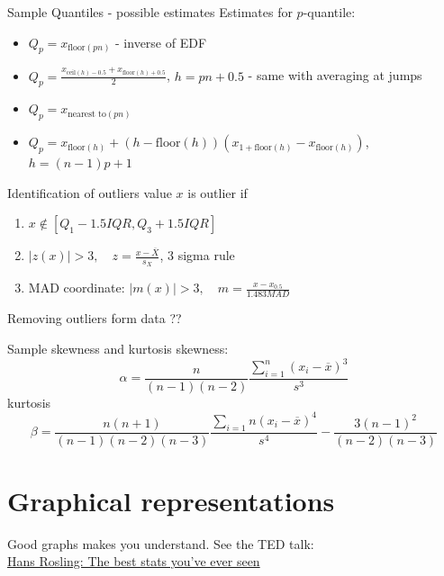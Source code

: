 \documentclass[smaller, hyperref={colorlinks=true}]{beamer}
\def\abs#1{\lvert#1\rvert}
\def\df#1{{\usebeamercolor[fg]{my orange} #1}}
\begin{document}
\begin{frame}{Sample Quantiles - possible estimates}
Estimates for $p$-quantile: 
\begin{itemize}
 \item $Q_p = x_{\text{floor}(pn)}$	- inverse of EDF
 \item $Q_p = \frac{x_{\text{ceil}(h)-0.5} + x_{\text{floor}(h)+0.5}}{2}$, $h=pn+0.5$ - same with averaging at jumps
 \item $Q_p = x_{\text{nearest to}(pn)}$ 
 \item $Q_p = x_{\text{floor}(h)} + (h - \text{floor}(h))(x_{1+\text{floor}(h) } - x_{\text{floor}(h)} ) $, $h=(n-1)p+1$ 
\end{itemize} 
\end{frame}


\begin{frame}{Identification of outliers}
value $x$ is outlier if
\begin{enumerate}
\item $x \notin [ Q_1 - 1.5 IQR, Q_3 + 1.5 IQR]$
\item $\abs{z(x)} > 3,\quad z = \frac{x - \overline{X}}{s_X}$, 3 sigma rule
\item MAD coordinate: $\abs{m(x)} > 3, \quad m = \frac{x - x_{0.5}}{1.483 MAD}$
\end{enumerate}

Removing outliers form data ??
\end{frame}

\begin{frame}{Sample skewness and kurtosis}
\df{skewness}:
\[
\alpha = \frac{n}{(n-1)(n-2)}\frac{\sum_{i=1}^{n} (x_i - \overline{x})^3}{s^3}
\]
\df{kurtosis}
\[
\beta = \frac{n(n+1)}{(n-1)(n-2)(n-3)}\frac{\sum_{i=1}{n} (x_i-\overline{x})^4}{s^4} - \frac{3(n-1)^2}{(n-2)(n-3)}
\]
\end{frame}


\section{Graphical representations}

\begin{frame}{Good graphs makes you understand.}
 See the TED talk:\\
 \href{http://www.ted.com/talks/hans_rosling_shows_the_best_stats_you_ve_ever_seen?language=en}{Hans Rosling: The best stats you've ever seen}
\end{frame}
\end{document}

